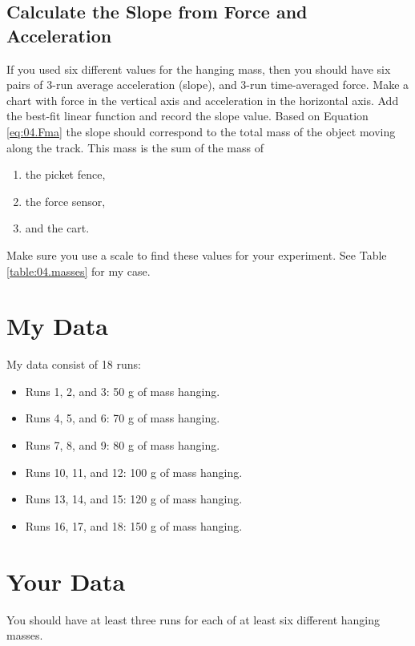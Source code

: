 \subsection{Calculate the Slope from Force and Acceleration}
If you used six different values for the hanging mass, then you should have six pairs of 3-run average acceleration (slope), and 3-run time-averaged force. Make a chart with force in the vertical axis and acceleration in the horizontal axis. Add the best-fit linear function and record the slope value. Based on Equation \ref{eq:04.Fma} the slope should correspond to the total mass of the object moving along the track. This mass is the sum of the mass of
\begin{enumerate}
    \item the picket fence,
    \item the force sensor,
    \item and the cart.
\end{enumerate}
Make sure you use a scale to find these values for your experiment. See Table \ref{table:04.masses} for my case.
\section{My Data}
My data consist of 18 runs:
\begin{itemize}
    \item Runs 1, 2, and 3: 50 g of mass hanging.
    \item Runs 4, 5, and 6: 70 g of mass hanging.
    \item Runs 7, 8, and 9: 80 g of mass hanging.
    \item Runs 10, 11, and 12: 100 g of mass hanging.
    \item Runs 13, 14, and 15: 120 g of mass hanging.
    \item Runs 16, 17, and 18: 150 g of mass hanging.
\end{itemize}
\section{Your Data}
You should have at least three runs for each of at least six different hanging masses.
\newpage
